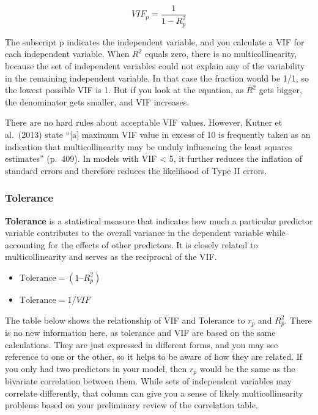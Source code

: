 \documentclass[
  letterpaper,
  DIV=11,
  numbers=noendperiod]{scrreprt}
\begin{document}
\[
VIF_p = \frac{1}{1 - R^2_p}
\]

The subscript p indicates the independent variable, and you calculate a
VIF for each independent variable. When \(R^2\) equals zero, there is no
multicollinearity, because the set of independent variables could not
explain any of the variability in the remaining independent variable. In
that case the fraction would be 1/1, so the lowest possible VIF is 1.
But if you look at the equation, as \(R^2\) gets bigger, the denominator
gets smaller, and VIF increases.\,\,

There are no hard rules about acceptable VIF values. However, Kutner et
al.~(2013) state ``{[}a{]} maximum VIF value in excess of 10 is
frequently taken as an indication that multicollinearity may be unduly
influencing the least squares estimates'' (p.~409). In models with VIF
\textless{} 5, it further reduces the inflation of standard errors and
therefore reduces the likelihood of Type II errors.

\subsubsection*{Tolerance\,}\label{tolerance}

\textbf{Tolerance} is a statistical measure that indicates how much a
particular predictor variable contributes to the overall variance in the
dependent variable while accounting for the effects of other predictors.
It is closely related to multicollinearity and serves as the reciprocal
of the VIF.

\begin{itemize}
\item
  \(\text{Tolerance} = (1 – R^2_p)\)\,
\item
  \(\text{Tolerance} = 1/VIF\)\,
\end{itemize}

The table below shows the relationship of VIF and Tolerance to \(r_p\)
and \(R^2_p\). There is no new information here, as tolerance and VIF
are based on the same calculations. They are just expressed in different
forms, and you may see reference to one or the other, so it helps to be
aware of how they are related. If you only had two predictors in your
model, then \(r_p\) would be the same as the bivariate correlation
between them. While sets of independent variables may correlate
differently, that column can give you a sense of likely
multicollinearity problems based on your preliminary review of the
correlation table.\,\,
\end{document}
